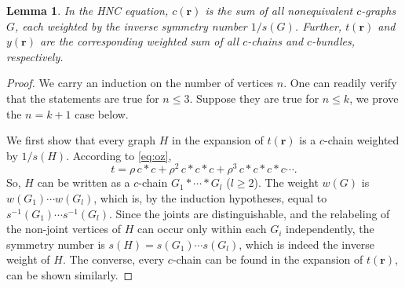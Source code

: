 \documentclass[preprint]{revtex4-1}
\newtheorem{lemm}[thrm]{Lemma}
\newcommand{\vct}[1]{\mathbf{#1}}
\providecommand{\vr}{} %
\renewcommand{\vr}{\vct{r}}
\begin{document}
\begin{lemm}
In the HNC equation,
%
$c(\vr)$
  is the sum of all nonequivalent $c$-graphs $G$,
  each weighted by the inverse symmetry number $1/s(G)$.
Further, $t(\vr)$ and $y(\vr)$ are the corresponding weighted sum of all
  $c$-chains and $c$-bundles, respectively.
  \label{thm:hnccr}
\end{lemm}
%
%
%
\begin{proof}
%
We carry an induction on the number of vertices $n$.
%
One can readily verify that the statements are true for $n \le 3$.
%
Suppose they are true for $n \le k$,
  we prove the $n = k + 1$ case below.


We first show that
  every graph $H$ in the expansion of $t(\vr)$
  is a $c$-chain weighted by $1/s(H)$.
%
According to \eqref{eq:oz},
\[
  t = \rho \, c*c + \rho^2 \, c * c * c + \rho^3 \, c*c*c*c \cdots.
\]
So, $H$ can be written as a $c$-chain
  $G_1 * \cdots * G_l$ ($l \ge 2$).
%
The weight $w(G)$ is
  $w(G_1) \cdots w(G_l)$,
  which is, by the induction hypotheses, equal to
  $s^{-1}(G_1) \cdots s^{-1}(G_l)$.
%
Since the joints are distinguishable,
  and the relabeling of the non-joint vertices  of $H$
  can occur only within each $G_i$ independently,
  the symmetry number is
  $s(H) = s(G_1) \cdots s(G_l)$,
  which is indeed the inverse weight of $H$.
%
The converse, every $c$-chain can be found in the expansion of $t(\vr)$,
can be shown similarly.


\end{proof}
\end{document}
